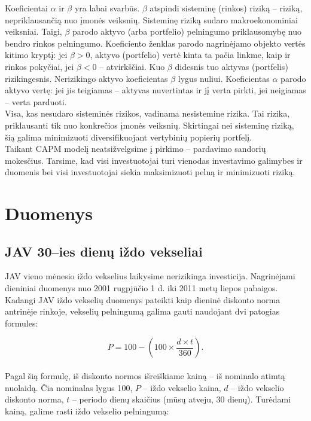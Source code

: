 \documentclass[12pt, a14paper, lithuanian]{article}
\begin{document}
Koeficientai $ \alpha $ ir $ \beta $ yra labai svarbūs. $ \beta $ atspindi sisteminę (rinkos) riziką -- riziką, nepriklausančią nuo įmonės veiksnių. Sisteminę riziką sudaro makroekonominiai veiksniai. Taigi, $ \beta $ parodo aktyvo (arba portfelio) pelningumo priklausomybę nuo bendro rinkos pelningumo. Koeficiento ženklas parodo nagrinėjamo objekto vertės kitimo kryptį: jei $ \beta > 0 $, aktyvo (portfelio) vertė kinta ta pačia linkme, kaip ir rinkos pokyčiai, jei $ \beta < 0 $ -- atvirkščiai. Kuo $ \beta $  didesnis tuo aktyvas (portfelis) rizikingesnis. Nerizikingo aktyvo koeficientas $ \beta $ lygus nuliui. Koeficientas $ \alpha $ parodo aktyvo vertę: jei jis teigiamas -- aktyvas nuvertintas ir jį verta pirkti, jei neigiamas -- verta parduoti.\\

Visa, kas nesudaro sisteminės rizikos, vadinama nesistemine rizika. Tai rizika, priklausanti tik nuo konkrečios įmonės veiksnių. Skirtingai nei sisteminę riziką, šią galima minimizuoti diversifikuojant vertybinių popierių portfelį.\\

Taikant CAPM modelį neatsižvelgsime į pirkimo -- pardavimo sandorių mokesčius. Tarsime, kad visi investuotojai turi vienodas investavimo galimybes ir duomenis bei visi investuotojai siekia maksimizuoti pelną ir minimizuoti riziką.



\newpage
\section{Duomenys}
\subsection{JAV 30--ies dienų iždo vekseliai}

JAV vieno mėnesio iždo vekselius laikysime nerizikinga investicija. Nagrinėjami dieniniai duomenys nuo 2001 rugpjūčio 1 d. iki 2011 metų liepos pabaigos\cite{tbills}.
Kadangi JAV iždo vekselių duomenys pateikti kaip dieninė diskonto norma antrinėje rinkoje, vekselių pelningumą galima gauti naudojant dvi patogias formules:


$$P = 100 - \left( 100 \times \frac{d \times t}{360}\right) .$$\\

Pagal šią formulę, iš diskonto normos išreiškiame kainą -- iš nominalo atimtą nuolaidą. 
Čia nominalas lygus 100, $P$ -- iždo vekselio kaina, $d$ -- iždo vekselio diskonto norma,
$t$ -- periodo dienų skaičius (mūsų atveju, 30 dienų). 
Turėdami kainą, galime rasti iždo vekselio pelningumą:
\end{document}
